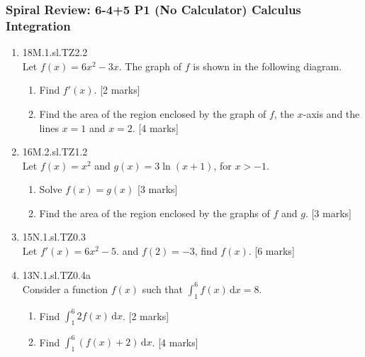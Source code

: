\documentclass[12pt, twoside]{article}
\begin{document}
\subsubsection*{Spiral Review: 6-4+5 P1 (No Calculator) Calculus Integration}
 \begin{enumerate}

  \item 18M.1.sl.TZ2.2\\
  Let $f(x)=6x^2-3x$. The graph of $f$ is shown in the following diagram.
    \begin{center}
    \end{center}
    \begin{enumerate}
      \item Find $f'(x)$. [2 marks]
      \item Find the area of the region enclosed by the graph of $f$, the $x$-axis and the lines $x = 1$ and $x = 2$. [4 marks]
    \end{enumerate}

    \item 16M.2.sl.TZ1.2\\
    Let $f(x)=x^2$ and $g(x)=3 \ln (x+1)$, for $x>-1$.
    \begin{enumerate}
      \item Solve $f(x)=g(x)$ [3 marks]
      \item Find the area of the region enclosed by the graphs of $f$ and $g$. [3 marks]
    \end{enumerate}

    \item 15N.1.sl.TZ0.3\\
    Let $f'(x)=6x^2-5$. and $f(2)=-3$, find $f(x)$. [6 marks]

    \item 13N.1.sl.TZ0.4a\\
    Consider a function $f(x)$ such that $\int_1^6 f(x) \,\mathrm{d}x
=8$.
    \begin{enumerate}
      \item Find $\int_1^6 2f(x) \,\mathrm{d}x$. [2 marks]
      \item Find $\int_1^6 (f(x)+2) \,\mathrm{d}x$. [4 marks]
    \end{enumerate}


\end{enumerate}
\end{document}
